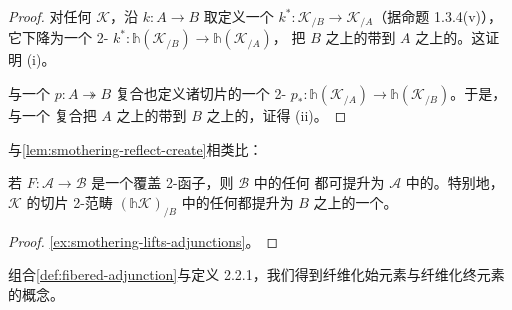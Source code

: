 \begin{proof}
对任何\trInfinityCosmos{} $\mathcal{K}$，沿 $k\colon A\to B$ 取\trPullback{}定义一个%
\trCosmologicalFunctor{} $k^{*}\colon\mathcal{K}_{/B}\to\mathcal{K}_{/A}$（据命题 1.3.4(v)），%
它下降为一个 2-\trTwoFunctor{} $k^{*}\colon\mathbb{h}(\mathcal{K}_{/B})\to\mathbb{h}(\mathcal{K}_{/A})$，%
把 $B$ 之上的\trFiberedAdjunction{}带到 $A$ 之上的\trFiberedAdjunction。这证明 (i)。

与一个\trIsofibration{} $p\colon A\twoheadrightarrow B$ 复合也定义诸切片的一个 2-\trTwoFunctor{} %
$p_{*}\colon\mathbb{h}(\mathcal{K}_{/A})\to\mathbb{h}(\mathcal{K}_{/B})$。于是，与一个 %
\trIsofibration{}复合把 $A$ 之上的\trFiberedAdjunction{}带到 $B$ 之上的\trFiberedAdjunction，证得 (ii)。
\end{proof}

与\cref{lem:smothering-reflect-create}相类比：

\begin{lemma}\label{lem:smothering-lift-adjunctions}
若 $F\colon\mathcal{A}\to\mathcal{B}$ 是一个覆盖 2-函子，则 $\mathcal{B}$ 中的任何\trAdjunction{}%
都可提升为 $\mathcal{A}$ 中的\trAdjunction。特别地，\trInfinityCosmos{} $\mathcal{K}$ 的切片 %
2-范畴 $(\mathbb{h}\mathcal{K})_{/B}$ 中的任何\trAdjunction{}都提升为 $B$ 之上的一个\trFiberedAdjunction。
\end{lemma}

\begin{proof}
\cref{ex:smothering-lifts-adjunctions}。
\end{proof}

组合\cref{def:fibered-adjunction}与定义 2.2.1，我们得到纤维化始元素与纤维化终元素的概念。


